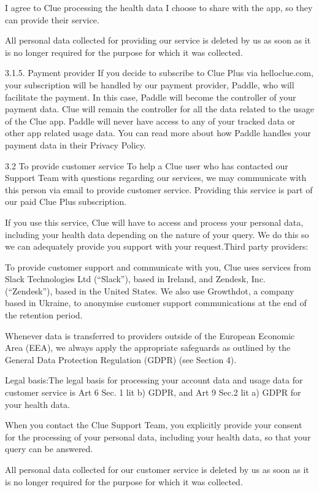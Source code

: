 I agree to Clue processing the health data I choose to share with the app, so they can provide their service.

All personal data collected for providing our service is deleted by us as soon as it is no longer required for the purpose for which it was collected.

3.1.5. Payment provider
If you decide to subscribe to Clue Plus via helloclue.com, your subscription will be handled by our payment provider, Paddle, who will facilitate the payment. In this case, Paddle will become the controller of your payment data. Clue will remain the controller for all the data related to the usage of the Clue app. Paddle will never have access to any of your tracked data or other app related usage data. You can read more about how Paddle handles your payment data in their Privacy Policy.

3.2 To provide customer service
To help a Clue user who has contacted our Support Team with questions regarding our services, we may communicate with this person via email to provide customer service. Providing this service is part of our paid Clue Plus subscription.

If you use this service, Clue will have to access and process your personal data, including your health data depending on the nature of your query. We do this so we can adequately provide you support with your request.Third party providers:

To provide customer support and communicate with you, Clue uses services from Slack Technologies Ltd (“Slack”), based in Ireland, and Zendesk, Inc. (“Zendesk”), based in the United States. We also use Growthdot, a company based in Ukraine, to anonymise customer support communications at the end of the retention period.

Whenever data is transferred to providers outside of the European Economic Area (EEA), we always apply the appropriate safeguards as outlined by the General Data Protection Regulation (GDPR) (see Section 4).

Legal basis:The legal basis for processing your account data and usage data for customer service is Art 6 Sec. 1 lit b) GDPR, and Art 9 Sec.2 lit a) GDPR for your health data.

When you contact the Clue Support Team, you explicitly provide your consent for the processing of your personal data, including your health data, so that your query can be answered.

All personal data collected for our customer service is deleted by us as soon as it is no longer required for the purpose for which it was collected.


